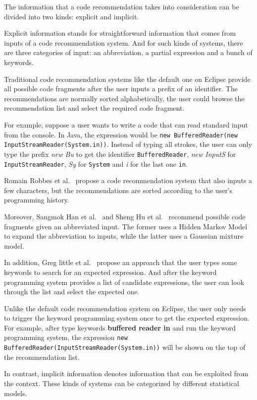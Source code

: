 \documentclass[PRO,english]{ipsj}
\begin{document}
The information that a code recommendation takes into consideration can be divided into two kinds: explicit and implicit. 

Explicit information stands for straightforward information that comes from inputs of a code recommendation system. And for such kinds of systems, there are three categories of input: an abbreviation, a partial expression and a bunch of keywords.

Traditional code recommendation systems like the default one on Eclipse provide all possible code fragments after the user inputs a prefix of an identifier. The recommendations are normally sorted alphabetically, the user could browse the recommendation list and select the required code fragment.  

For example, suppose a user wants to write a code that can read standard input from the console. In Java, the expression would be \texttt{new BufferedReader(new InputStreamReader(System.in))}. Instead of typing all strokes, the user can only type the prefix \textit{new Bu} to get the identifier \texttt{BufferedReader}, \textit{new InputS} for \texttt{InputStreamReader}, \textit{Sy} for \texttt{System} and \textit{i} for the last one \texttt{in}. 

Romain Robbes et al.~\cite{ProgramHistory} propose a code recommendation system that also inputs a few characters, but the recommendations are sorted according to the user’s programming history.

Moreover, Sangmok Han et al.~\cite{Sangmok} and Sheng Hu et al.~\cite{Sheng} recommend possible code fragments given an abbreviated input. The former uses a Hidden Markov Model to expand the abbreviation to inputs, while the latter uses a Gaussian mixture model. 

In addition, Greg little et al.~\cite{KeywordProgramming} propose an approach that the user types some keywords to search for an expected expression. And after the keyword programming system provides a list of candidate expressions, the user can look through the list and select the expected one. 

Unlike the default code recommendation system on Eclipse, the user only needs to trigger the keyword programming system once to get the expected expression. For example, after type keywords \textbf{buffered reader in} and run the keyword programming system, the expression \texttt{new BufferedReader(InputStreamReader(System.in))} will be shown on the top of the recommendation list.

In contrast, implicit information denotes information that can be exploited from the context. These kinds of systems can be categorized by different statistical models.
\end{document}
